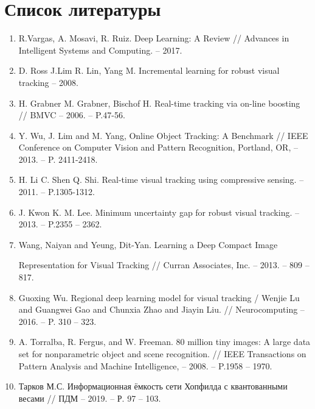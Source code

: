 \section*{Список литературы}
\begin{enumerate}[leftmargin=0em, itemindent=2.5 em,itemsep=1.5 pt,parsep=1.5 pt]

    \item R.Vargas, A. Mosavi, R. Ruiz. Deep Learning: A Review // Advances in \\ Intelligent Systems and Computing. -- 2017.
    \item D. Ross J.Lim R. Lin, Yang M. Incremental learning for robust visual tracking -- 2008.
    \item H. Grabner M. Grabner, Bischof H. Real-time tracking via on-line boosting // BMVC -- 2006. -- P.47-56.
    \item Y. Wu, J. Lim and M. Yang, Online Object Tracking: A Benchmark // IEEE Conference on Computer Vision and Pattern Recognition, Portland, OR, -- 2013. -- P. 2411-2418.
    \item H. Li C. Shen Q. Shi. Real-time visual tracking using compressive sensing. -- 2011. -- P.1305-1312.
    \item J. Kwon K. M. Lee. Minimum uncertainty gap for robust visual tracking. -- 2013. -- P.2355 -- 2362.
    \item Wang, Naiyan and Yeung, Dit-Yan. Learning a Deep Compact Image
    
    Representation for Visual Tracking // Curran Associates, Inc. -- 2013. -- 809 -- 817.
    \item Guoxing Wu. Regional deep learning model for visual tracking /  Wenjie Lu and Guangwei Gao and Chunxia Zhao and Jiayin Liu. // Neurocomputing -- 2016. -- P. 310 -- 323.
    \item A. Torralba, R. Fergus, and W. Freeman. 80 million tiny images: A large data set for nonparametric object and scene recognition. // IEEE Transactions on Pattern Analysis and Machine Intelligence, -- 2008. -- P.1958 -- 1970.
    \item Тарков М.С. Информационная ёмкость сети Хопфилда с квантованными весами // ПДМ -- 2019. -- Р. 97 -- 103.
\end{enumerate}